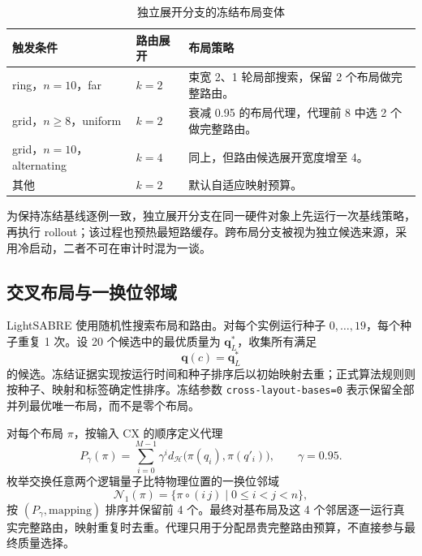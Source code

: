 \documentclass[11pt,a4paper]{article}
\newcommand{\Hardware}{\mathcal H}
\begin{document}
\begin{table}[H]
\centering
\small
\caption{独立展开分支的冻结布局变体}
\label{tab:native-variants}
\begin{tabularx}{\textwidth}{p{}p{}Y}
\toprule
触发条件 & 路由展开 & 布局策略 \\
\midrule
ring，$n=10$，far & $k=2$ &
束宽 2、1 轮局部搜索，保留 2 个布局做完整路由。\\
grid，$n\ge8$，uniform & $k=2$ &
衰减 0.95 的布局代理，代理前 8 中选 2 个做完整路由。\\
grid，$n=10$，alternating & $k=4$ &
同上，但路由候选展开宽度增至 4。\\
其他 & $k=2$ &
默认自适应映射预算。\\
\bottomrule
\end{tabularx}
\end{table}

为保持冻结基线逐例一致，独立展开分支在同一硬件对象上先运行一次基线策略，再执行 rollout；该过程也预热最短路缓存。跨布局分支被视为独立候选来源，采用冷启动，二者不可在审计时混为一谈。

\subsection{交叉布局与一换位邻域}

LightSABRE 使用随机性搜索布局和路由。对每个实例运行种子 $0,\ldots,19$，每个种子重复 1 次。设 20 个候选中的最优质量为 $\mathbf q_L^*$，收集所有满足
\begin{equation}
  \mathbf q(c)=\mathbf q_L^*
\end{equation}
的候选。冻结证据实现按运行时间和种子排序后以初始映射去重；正式算法规则则按种子、映射和标签确定性排序。冻结参数 \texttt{cross-layout-bases=0} 表示保留全部并列最优唯一布局，而不是零个布局。

对每个布局 $\pi$，按输入 CX 的顺序定义代理
\begin{equation}
  P_{\gamma}(\pi)
  =\sum_{i=0}^{M-1}\gamma^i
  d_{\Hardware}\bigl(\pi(q_i),\pi(q'_i)\bigr),
  \qquad \gamma=0.95.
  \label{eq:layout-proxy}
\end{equation}
枚举交换任意两个逻辑量子比特物理位置的一换位邻域
\begin{equation}
  \mathcal N_1(\pi)
  =\{\pi\circ(i\,j)\mid 0\le i<j<n\},
\end{equation}
按 $(P_{\gamma},\text{mapping})$ 排序并保留前 4 个。最终对基布局及这 4 个邻居逐一运行真实完整路由，映射重复时去重。代理只用于分配昂贵完整路由预算，不直接参与最终质量选择。
\end{document}
